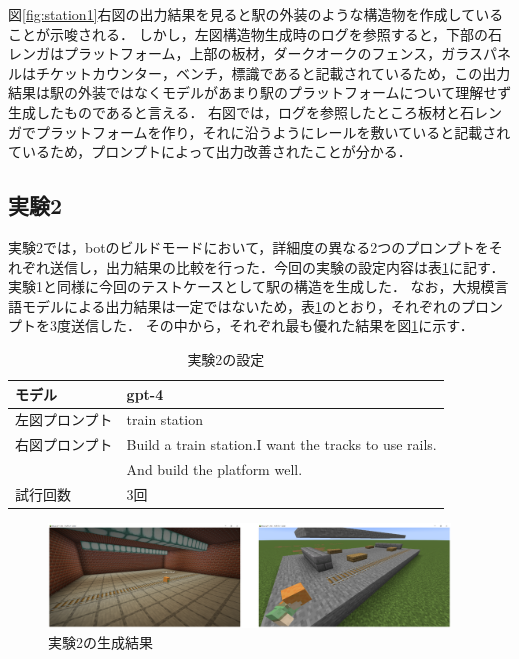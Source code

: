 図\ref{fig:station1}右図の出力結果を見ると駅の外装のような構造物を作成していることが示唆される．
しかし，左図構造物生成時のログを参照すると，下部の石レンガはプラットフォーム，上部の板材，ダークオークのフェンス，ガラスパネルはチケットカウンター，ベンチ，標識であると記載されているため，この出力結果は駅の外装ではなくモデルがあまり駅のプラットフォームについて理解せず生成したものであると言える．
右図では，ログを参照したところ板材と石レンガでプラットフォームを作り，それに沿うようにレールを敷いていると記載されているため，プロンプトによって出力改善されたことが分かる．

\subsection{実験2}\label{sec:ex2}
実験2では，botのビルドモードにおいて，詳細度の異なる2つのプロンプトをそれぞれ送信し，出力結果の比較を行った．今回の実験の設定内容は表\ref{tab:setting2}に記す．
実験1と同様に今回のテストケースとして駅の構造を生成した．
なお，大規模言語モデルによる出力結果は一定ではないため，表\ref{tab:setting2}のとおり，それぞれのプロンプトを3度送信した．
その中から，それぞれ最も優れた結果を図\ref{fig:station2}に示す．
\begin{table}[H]
    \caption{実験2の設定}\label{tab:setting2}
    \centering
    \begin{tabular}{ll}
        \hline \hline
        モデル & gpt-4 \\
        \hline
        左図プロンプト & train station \\
        \hline
        右図プロンプト & Build a train station.I want the tracks to use rails. \\
        　 & And build the platform well. \\
        \hline
        試行回数 & 3回 \\
        \hline
    \end{tabular}
\end{table}

\begin{figure}[H]
    \centering
    \includegraphics[width=0.95\textwidth]{fig/train_station2.PNG}
    \caption{実験2の生成結果}
    \label{fig:station2}
\end{figure}

